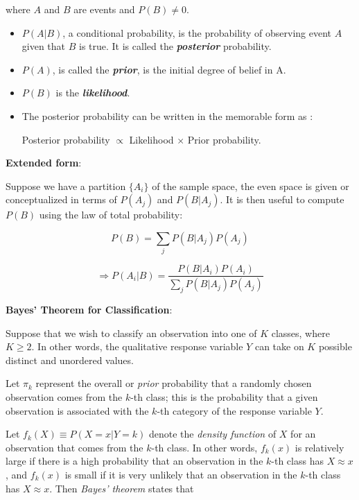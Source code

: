 \documentclass[]{book}
\providecommand{\tightlist}{%
  \setlength{\itemsep}{0pt}\setlength{\parskip}{0pt}}
\newenvironment{rmdblock}[1]
  {\begin{shaded*}
  \begin{itemize}
  \renewcommand{\labelitemi}{
    \raisebox{-.7\height}[0pt][0pt]{
      {\setkeys{Gin}{width=2em,keepaspectratio}\texttt{[image: img/icons/\#1]}}
    }
  }
  \item
  }
  {
  \end{itemize}
  \end{shaded*}
  }
\newenvironment{rmdinsight}
  {\begin{rmdblock}{insight}}
  {\end{rmdblock}}
\begin{document}
where \(A\) and \(B\) are events and \(P(B) \neq 0\).

\begin{itemize}
\tightlist
\item
  \(P(A | B)\), a conditional probability, is the probability of
  observing event \(A\) given that \(B\) is true. It is called the
  \textbf{\emph{posterior}} probability.
\item
  \(P(A)\), is called the \textbf{\emph{prior}}, is the initial degree
  of belief in A.
\item
  \(P(B)\) is the \textbf{\emph{likelihood}}.
\end{itemize}

\begin{rmdinsight}
The posterior probability can be written in the memorable form as :

Posterior probability \(\propto\) Likelihood \(\times\) Prior
probability.
\end{rmdinsight}

\textbf{Extended form}:

Suppose we have a partition \(\{A_i\}\) of the sample space, the even
space is given or conceptualized in terms of \(P(A_j)\) and
\(P(B | A_j)\). It is then useful to compute \(P(B)\) using the law of
total probability:

\[ P(B) = \sum_j P(B|A_j) P(A_j) \]

\[ \Rightarrow P(A_i|B) = \frac{P(B|A_i) P(A_i)}{\sum_j P(B|A_j) P(A_j)} \]

\textbf{Bayes' Theorem for Classification}:

Suppose that we wish to classify an observation into one of \(K\)
classes, where \(K \geq 2\). In other words, the qualitative response
variable \(Y\) can take on \(K\) possible distinct and unordered values.

Let \(\pi_k\) represent the overall or \emph{prior} probability that a
randomly chosen observation comes from the \(k\)-th class; this is the
probability that a given observation is associated with the \(k\)-th
category of the response variable \(Y\).

Let \(f_k(X) \equiv P(X = x|Y = k)\) denote the \emph{density function}
of \(X\) for an observation that comes from the \(k\)-th class. In other
words, \(f_k(x)\) is relatively large if there is a high probability
that an observation in the \(k\)-th class has \(X \approx x\), and
\(f_k(x)\) is small if it is very unlikely that an observation in the
\(k\)-th class has \(X \approx x\). Then \emph{Bayes' theorem} states
that
\end{document}
